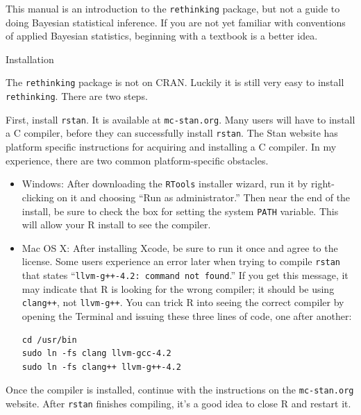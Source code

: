 \documentclass[11pt,reqno]{amsart}
\makeatletter
\renewcommand\subsection{\@startsection{subsection}{2}
\z@{.5\linespacing\@plus.7\linespacing}{-.5em}%
{\normalfont\normalsize\bfseries}}
\newcommand{\ttx}[1]{\texttt{#1}}
\makeatother
\begin{document}
This manual is an introduction to the \ttx{rethinking} package, but not a guide to doing Bayesian statistical inference. If you are not yet familiar with conventions of applied Bayesian statistics, beginning with a textbook is a better idea. 

\subsection{Installation}

The \texttt{rethinking} package is not on CRAN. %
Luckily it is still very easy to install \texttt{rethinking}. There are two steps. 

First, install \texttt{rstan}. It is available at \texttt{mc-stan.org}. Many users will have to install a C compiler, before they can successfully install \texttt{rstan}. The Stan website has platform specific instructions for acquiring and installing a C compiler. In my experience, there are two common platform-specific obstacles.
\begin{itemize}
\item Windows: After downloading the \texttt{RTools} installer wizard, run it by right-clicking on it and choosing ``Run as administrator.'' Then near the end of the install, be sure to check the box for setting the system \texttt{PATH} variable. This will allow your \textsf{R} install to see the compiler.
\item Mac OS X: After installing Xcode, be sure to run it once and agree to the license. Some users experience an error later when trying to compile \texttt{rstan} that states ``\texttt{llvm-g++-4.2: command not found}.'' If you get this message, it may indicate that \textsf{R} is looking for the wrong compiler; it should be using \texttt{clang++}, not \texttt{llvm-g++}. You can trick \textsf{R} into seeing the correct compiler by opening the Terminal and issuing these three lines of code, one after another:
\begin{verbatim}
cd /usr/bin
sudo ln -fs clang llvm-gcc-4.2
sudo ln -fs clang++ llvm-g++-4.2
\end{verbatim}
\end{itemize}
Once the compiler is installed, continue with the instructions on the \texttt{mc-stan.org} website. After \texttt{rstan} finishes compiling, it's a good idea to close \textsf{R} and restart it.
\end{document}
